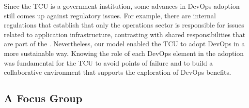 Since the TCU is a government institution, some advances in DevOps adoption still comes up
against regulatory issues. For example, there are internal regulations that
establish that only the operations sector is responsible for issues related to
application infrastructure, contrasting with shared responsibilities that are
part of the \cc. Nevertheless, our model enabled the TCU to adopt DevOps in a more
sustainable way. Knowing the role
of each DevOps element in the adoption was fundamental for the TCU to avoid points
of failure and to build a collaborative environment that supports the
exploration of DevOps benefits.

\subsection{A Focus Group}

